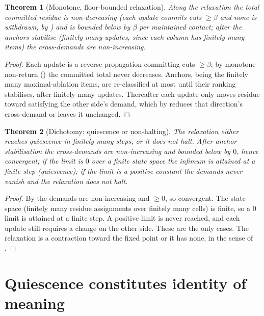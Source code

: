 \documentclass[twocolumn,11pt,a4paper]{article}
\theoremstyle{sup}
\newtheorem{theorem}{Theorem}[section]
\theoremstyle{definition}
\theoremstyle{remark}
\newcommand{\flo}{\beta}
\begin{document}
\begin{theorem}[Monotone, floor-bounded relaxation]
\label{thm:relax-mono}
Along the relaxation the total committed residue is non-decreasing (each update
commits cuts $\ge\flo$ and none is withdrawn, by ) and is
bounded below by $\flo$ per maintained contact; after the anchors stabilise
(finitely many updates, since each column has finitely many items) the
cross-demands are non-increasing.
\end{theorem}

\begin{proof}
Each update is a reverse propagation committing cuts $\ge\flo$; by monotone
non-return () the committed total never decreases. Anchors,
being the finitely many maximal-ablation items, are re-classified at most until
their ranking stabilises, after finitely many updates. Thereafter each update
only moves residue toward satisfying the other side's demand, which by
 reduces that direction's cross-demand or leaves it unchanged.
\end{proof}

\begin{theorem}[Dichotomy: quiescence or non-halting]
\label{thm:dichotomy}
The relaxation either reaches quiescence in finitely many steps, or it does not
halt. After anchor stabilisation the cross-demands are non-increasing and bounded
below by $0$, hence convergent; if the limit is $0$ over a finite state space the
infimum is attained at a finite step (quiescence); if the limit is a positive
constant the demands never vanish and the relaxation does not halt.
\end{theorem}

\begin{proof}
By  the demands are non-increasing and $\ge0$, so
convergent. The state space (finitely many residue assignments over finitely
many cells) is finite, so a $0$ limit is attained at a finite step. A positive
limit is never reached, and each update still requires a change on the other
side. These are the only cases. The relaxation is a contraction toward the fixed
point or it has none, in the sense of \citep{banach1922,tarski1955}.
\end{proof}

\section{Quiescence constitutes identity of meaning}
\label{sec:quiescence}
\end{document}
